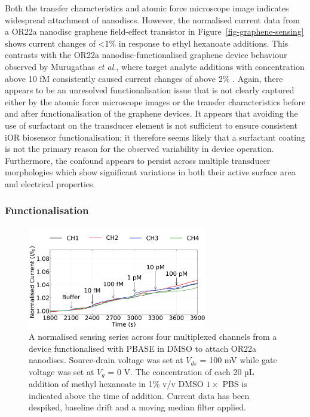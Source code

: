 \documentclass[
  a4paper,
]{scrbook}
\begin{document}
Both the transfer characteristics and atomic force microscope image
indicates widespread attachment of nanodiscs. However, the normalised
current data from a OR22a nanodisc graphene field-effect transistor in
Figure~\ref{fig-graphene-sensing} shows current changes of \textless1\%
in response to ethyl hexanoate additions. This contrasts with the OR22a
nanodisc-functionalised graphene device behaviour observed by Murugathas
\emph{et al.}, where target analyte additions with concentration above
10 fM consistently caused current changes of above 2\%
\autocite{Murugathas2020}. Again, there appears to be an unresolved
functionalisation issue that is not clearly captured either by the
atomic force microscope images or the transfer characteristics before
and after functionalisation of the graphene devices. It appears that
avoiding the use of surfactant on the transducer element is not
sufficient to ensure consistent iOR biosensor functionalisation; it
therefore seems likely that a surfactant coating is not the primary
reason for the observed variability in device operation. Furthermore,
the confound appears to persist across multiple transducer morphologies
which show significant variations in both their active surface area and
electrical properties.

\hypertarget{functionalisation}{%
\subsubsection*{Functionalisation}\label{functionalisation}}

\begin{figure}

{\centering \includegraphics[width=0.7\textwidth,height=\textheight]{figures/ch8/NTQ25C10_OR22a_sample_220208_filtered_detrend_trunc_arrows_normalised.png}

}

\caption{\label{fig-DMSO-sensing}A normalised sensing series across four
multiplexed channels from a device functionalised with PBASE in DMSO to
attach OR22a nanodiscs. Source-drain voltage was set at \(V_{ds}\) = 100
mV while gate voltage was set at \(V_g\) = 0 V. The concentration of
each 20 µL addition of methyl hexanoate in 1\% v/v DMSO \(1 \times\) PBS
is indicated above the time of addition. Current data has been despiked,
baseline drift and a moving median filter applied.}

\end{figure}
\end{document}
